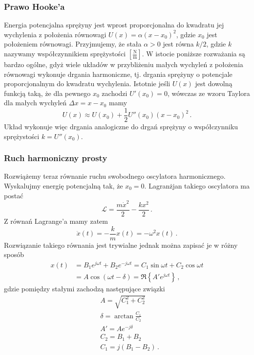 \documentclass[../main.tex]{subfiles}
\begin{document}
    \subsubsection{Prawo Hooke'a}
    Energia potencjalna sprężyny jest wprost proporcjonalna do kwadratu jej wychylenia z położenia równowagi \(U(x)=\alpha(x-x_0)^2\), gdzie \(x_0\) jest położeniem równowagi. Przyjmujemy, że stała \(\alpha>0\) jest równa \(k/2\), gdzie \(k\) nazywamy współczynnikiem sprężystości \([\frac{\text{N}}{\text{m}}]\). W istocie poniższe rozważania są bardzo ogólne, gdyż wiele układów w przybliżeniu małych wychyleń z położenia równowagi wykonuje drgania harmoniczne, tj. drgania sprężyny o potencjale proporcjonalnym do kwadratu wychylenia. Istotnie jeśli \(U(x)\) jest dowolną funkcją taką, że dla pewnego \(x_0\) zachodzi \(U'(x_0)=0\), wówczas ze wzoru Taylora dla małych wychyleń \(\Delta x=x-x_0\) mamy 
    \begin{equation*}
        U(x)\approx U(x_0)+\frac{1}{2}U''(x_0)(x-x_0)^2\,.
    \end{equation*}
    Układ wykonuje więc drgania analogiczne do drgań sprężyny o współczynniku sprężystości \(k=U''(x_0)\).
    \subsubsection{Ruch harmoniczny prosty}
    Rozwiążemy teraz równanie ruchu swobodnego oscylatora harmonicznego. Wyskalujmy energię potencjalną tak, że \(x_0=0\). Lagranżjan takiego oscylatora ma postać
    \begin{equation*}
        \mathcal{L}=\frac{m\dot{x}^2}{2}-\frac{kx^2}{2}\,.
    \end{equation*}
    Z równań Lagrange'a mamy zatem
    \begin{equation*}
        \ddot x(t)=-\frac{k}{m}x(t)=-\omega^2 x(t)\,.
    \end{equation*}
    Rozwiązanie takiego równania jest trywialne jednak można zapisać je w różny sposób
    \begin{equation*}
    \begin{split}
        x(t)&=B_1e^{j\omega t}+B_2e^{-j\omega t}=C_1\sin\omega t+C_2\cos\omega t\\
        &= A\cos(\omega t-\delta)=\Re\left\{A'e^{j\omega t}\right\}\,,
    \end{split}
    \end{equation*}
    gdzie pomiędzy stałymi zachodzą następujące związki
    \begin{equation*}
    \begin{split}
        &A=\sqrt{C_1^2+C_2^2}\\
        &\delta=\arctan\frac{C_1}{C_2}\\
        &A'=Ae^{-j\delta}\\
        &C_2=B_1+B_2\\
        &C_1=j(B_1-B_2)\,.
    \end{split}
    \end{equation*}
    
\end{document}
